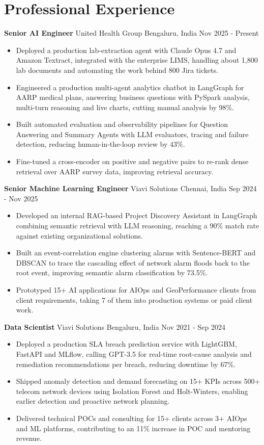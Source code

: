 \documentclass[10pt,a4paper]{article}
\newcommand{\role}[4]{\textbf{#1} \textbar{} #2 \hfill #3 \textbar{} #4\par}
\begin{document}
\section{Professional Experience}
\role{Senior AI Engineer}{United Health Group}{Bengaluru, India}{Nov 2025 - Present}
\begin{itemize}
  \item Deployed a production lab-extraction agent with Claude Opus 4.7 and Amazon Textract, integrated with the enterprise LIMS, handling about 1,800 lab documents and automating the work behind 800 Jira tickets.
  \item Engineered a production multi-agent analytics chatbot in LangGraph for AARP medical plans, answering business questions with PySpark analysis, multi-turn reasoning and live charts, cutting manual analysis by 98\%.
  \item Built automated evaluation and observability pipelines for Question Answering and Summary Agents with LLM evaluators, tracing and failure detection, reducing human-in-the-loop review by 43\%.
  \item Fine-tuned a cross-encoder on positive and negative pairs to re-rank dense retrieval over AARP survey data, improving retrieval accuracy.
\end{itemize}
\vspace{3pt}
\role{Senior Machine Learning Engineer}{Viavi Solutions}{Chennai, India}{Sep 2024 - Nov 2025}
\begin{itemize}
  \item Developed an internal RAG-based Project Discovery Assistant in LangGraph combining semantic retrieval with LLM reasoning, reaching a 90\% match rate against existing organizational solutions.
  \item Built an event-correlation engine clustering alarms with Sentence-BERT and DBSCAN to trace the cascading effect of network alarm floods back to the root event, improving semantic alarm classification by 73.5\%.
  \item Prototyped 15+ AI applications for AIOps and GeoPerformance clients from client requirements, taking 7 of them into production systems or paid client work.
\end{itemize}
\vspace{3pt}
\role{Data Scientist}{Viavi Solutions}{Bengaluru, India}{Nov 2021 - Sep 2024}
\begin{itemize}
  \item Deployed a production SLA breach prediction service with LightGBM, FastAPI and MLflow, calling GPT-3.5 for real-time root-cause analysis and remediation recommendations per breach, reducing downtime by 67\%.
  \item Shipped anomaly detection and demand forecasting on 15+ KPIs across 500+ telecom network devices using Isolation Forest and Holt-Winters, enabling earlier detection and proactive network planning.
  \item Delivered technical POCs and consulting for 15+ clients across 3+ AIOps and ML platforms, contributing to an 11\% increase in POC and mentoring revenue.
\end{itemize}
\end{document}
